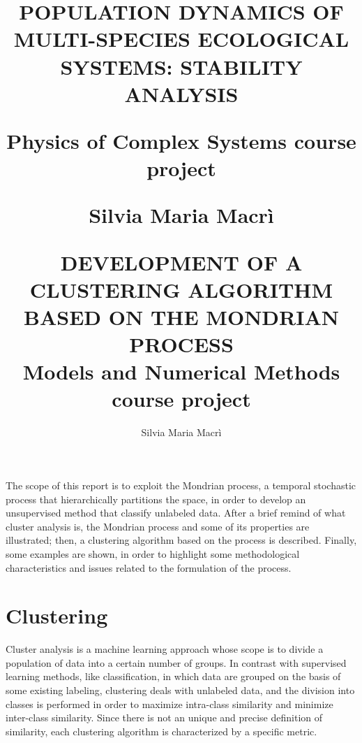 \documentclass[a4paper]{article}
\title{%

\begin{flushleft}
\begin{LARGE}
POPULATION DYNAMICS OF MULTI-SPECIES ECOLOGICAL SYSTEMS: STABILITY ANALYSIS\\\end{LARGE}
\vspace{0.5 cm}
\begin{large}
Physics of Complex Systems course project\\ \end{large}\vspace{0.3 cm}
\begin{LARGE}
Silvia Maria Macrì\\
\end{LARGE}
\end{flushleft}
}
\date{}
\title{DEVELOPMENT OF A CLUSTERING ALGORITHM BASED ON THE MONDRIAN PROCESS\\
Models and Numerical Methods course project}
\date{}
\author{Silvia Maria Macrì}
\begin{document}
\tableofcontents
\newpage












\maketitle



The scope of this report is to exploit the Mondrian process, a temporal stochastic process that hierarchically partitions the space, in order to develop an unsupervised method that classify unlabeled data.
After a brief remind of what cluster analysis is, the Mondrian process and some of its properties are illustrated;
then, a clustering algorithm based on the process is described.
Finally, some examples are shown, in order to highlight some methodological characteristics and issues related to the formulation of the process. 







\section{Clustering}

Cluster analysis is a machine learning approach whose scope is to divide a population of data into a certain number of groups.
In contrast with supervised learning methods, like classification, in which data are grouped on the basis of some existing labeling, clustering deals with unlabeled data, and the division into classes is performed in order to maximize intra-class similarity and minimize inter-class similarity.
Since there is not an unique and precise definition of similarity, each clustering algorithm is characterized by a specific metric.
\end{document}
